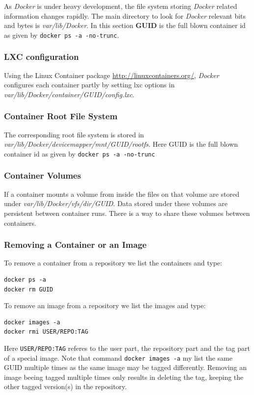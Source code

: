 \documentclass[captions=tableheading]{article}
\begin{document}
As \emph{Docker} is under heavy development, the file system storing \emph{Docker} related information changes rapidly. The main directory to look for \emph{Docker} relevant bits and bytes is \emph{var/lib/Docker}. In this section \textbf{GUID} is the full blown container id as given by \texttt{docker ps -a -no-trunc}.
\subsubsection{LXC configuration}
\label{sec-2-5-1}

Using the Linux Container package \href{file://./lxc/}{http://linuxcontainers.org/}, \emph{Docker} configures each container partly by setting lxc options in \emph{var/lib/Docker/container/GUID/config.lxc}. 
\subsubsection{Container Root File System}
\label{sec-2-5-2}

The corresponding root file system is stored in \emph{var/lib/Docker/devicemapper/mnt/GUID/rootfs}.
Here GUID is the full blown container id as given by \texttt{docker ps -a -no-trunc}  
\subsubsection{Container Volumes}
\label{sec-2-5-3}

    If a container mounts a volume from inside the files on that volume are stored under \emph{var/lib/Docker/vfs/dir/GUID}. Data stored under these volumes are persistent between container runs. There is a way to share these volumes between containers. 
\subsubsection{Removing a Container or an Image}
\label{sec-2-5-4}

To remove a container from a repository we list the containers and type:

\begin{verbatim}
docker ps -a
docker rm GUID
\end{verbatim}
To remove an image from a repository we list the images and type:

\begin{verbatim}
docker images -a
docker rmi USER/REPO:TAG
\end{verbatim}
Here \texttt{USER/REPO:TAG} referes to the user part, the repository part and the tag part of a special image. Note that command \texttt{docker images -a} my list the same GUID multiple times as the same image may be tagged differently. Removing an image beeing tagged multiple times only results in deleting the tag, keeping the other tagged version(s) in the repository.   
\end{document}
